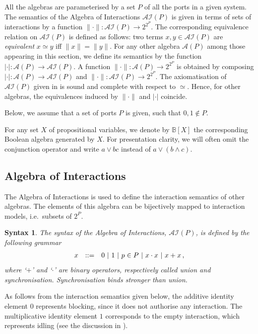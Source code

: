 \documentclass{llncs}
\newcommand{\cA}{\ensuremath{\mathcal{A}}}
\newcommand{\sB}{\ensuremath{\mathbb{B}}}
\newcommand{\ie}[1][\ ]{i.e.#1}
\newcommand{\intsem}[1]{\ensuremath{\|{#1}\|}}
\newcommand{\aisem}[1]{\ensuremath{|{#1}|}}
\newtheorem*{syntax}{Syntax}
\newcommand{\ai}{\ensuremath{\mathcal{AI}}}
\begin{document}
All the algebras are
parameterised by a set $P$ of all the ports in a given system.  The
semantics of the Algebra of Interactions $\ai(P)$ is given in terms of
sets of interactions by a function $\intsem{\cdot}: \ai(P) \rightarrow
2^{2^P}$.  The corresponding equivalence relation on $\ai(P)$ is
defined as follows: two terms $x,y \in \ai(P)$ are {\em equivalent} $x
\simeq y$ iff $\intsem{x} = \intsem{y}$.  For any other algebra
$\cA(P)$ among those appearing in this section, we define its
semantics by the function $\aisem{\cdot}: \cA(P) \rightarrow \ai(P)$.
A function $\intsem{\cdot}: \cA(P) \rightarrow 2^{2^P}$ is obtained by
composing $\aisem{\cdot}: \cA(P) \rightarrow \ai(P)$ and
$\intsem{\cdot}: \ai(P) \rightarrow 2^{2^P}$.  The axiomatisation of
$\ai(P)$ given in \cite{BliSif07-acp-emsoft} is sound and complete
with respect to $\simeq$.  Hence, for other algebras, the equivalences
induced by $\intsem{\cdot}$ and $\aisem{\cdot}$ coincide.

Below, we assume that a set of ports $P$ is given, such that $0,1\not\in
P$.

For any set $X$ of propositional variables, we denote by $\sB[X]$ the
corresponding Boolean algebra generated by $X$.  For presentation
clarity, we will often omit the conjunction operator and write $a \lor
bc$ instead of $a \lor (b \land c)$.



\subsection{Algebra of Interactions}
\label{secn:ai}

The Algebra of Interactions is used to define the interaction semantics of other algebras. The elements of this algebra can be bijectively mapped to interaction models, \ie subsets of $2^P$.

\begin{syntax}
The syntax of the {\em Algebra of Interactions}, $\ai(P)$, is defined by
the following grammar
%
\begin{equation} \label{eq:apsynt}
  \begin{array}{rc*{4}{l@{\ |\ }}l}
    x & ::= & 0 & 1 & p \in P & x\cdot x & x + x \,,\\
  \end{array}
\end{equation}
%
where `$+$' and `$\cdot$' are binary operators, respectively called
{\em union} and {\em synchronisation}.  Synchronisation binds stronger
than union.
\end{syntax}
%
As follows from the interaction semantics given below, the additive
identity element $0$ represents blocking, since it does not authorise
any interaction.  The multiplicative identity element $1$ corresponds
to the empty interaction, which represents idling (see the discussion
in \cite{BarBliu15-offer-scico}).
\end{document}
